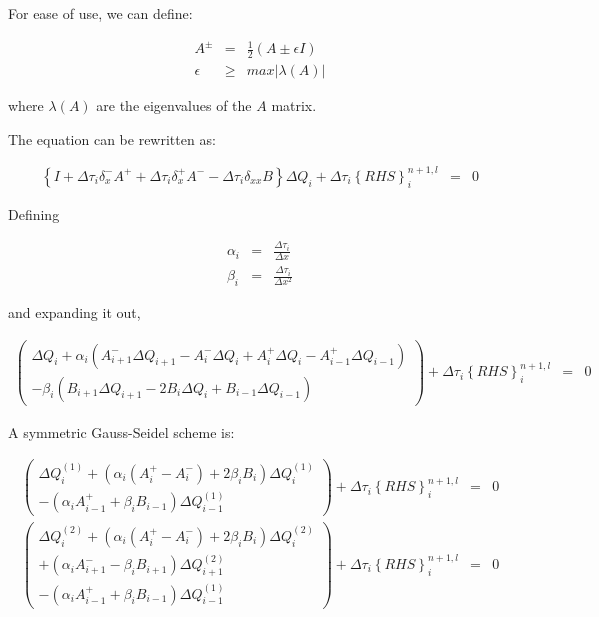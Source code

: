 For ease of use, we can define:

\begin{eqnarray}
A^{\pm} &=& \frac{1}{2} \left(A \pm \epsilon I \right)
\nonumber
\\
\epsilon &\ge& max \left|\lambda \left(A \right) \right|
\nonumber
\end{eqnarray}

where $\lambda \left(A \right)$ are the eigenvalues of the $A$ matrix.

The equation can be rewritten as:

\begin{eqnarray}
\left\{ I 
+ \Delta \tau_i \delta_x^- A^+ 
+ \Delta \tau_i \delta_x^+ A^- 
- \Delta \tau_i \delta_{xx} B 
\right\} \Delta Q_i 
+ \Delta \tau_i \left\{RHS \right\}^{n+1,l}_i &=& 0
\nonumber
\end{eqnarray}

Defining

\begin{eqnarray}
\alpha_i &=& \frac{\Delta \tau_i}{\Delta x}
\nonumber
\\
\beta_i &=& \frac{\Delta \tau_i}{\Delta x^2}
\nonumber
\end{eqnarray}

and expanding it out,

\begin{eqnarray}
\left(
\begin{array}{c}
\Delta Q_i 
+
\alpha_i
\left(
A^-_{i+1} \Delta Q_{i+1}
-A^-_{i} \Delta Q_{i}
+A^+_{i} \Delta Q_{i}
-A^+_{i-1} \Delta Q_{i-1}
\right)
\\
-
\beta_i
\left(
B_{i+1} \Delta Q_{i+1}
-2 B_{i} \Delta Q_{i}
+B_{i-1} \Delta Q_{i-1}
\right)
\end{array}
\right)
+ \Delta \tau_i \left\{RHS \right\}^{n+1,l}_i &=& 0
\nonumber
\end{eqnarray}

A symmetric Gauss-Seidel scheme is:

\begin{eqnarray}
\left(
\begin{array}{c}
\Delta Q^{\left(1 \right)}_i
+ \left(
\alpha_i \left(A^+_i - A^-_i \right)
+ 2 \beta_i B_i \right)
\Delta Q^{\left(1 \right)}_i
\\
-
\left( 
\alpha_i A^+_{i-1} 
+
\beta_i B_{i-1} 
\right)
\Delta Q^{\left(1 \right)}_{i-1}
\end{array}
\right)
+ \Delta \tau_i \left\{RHS \right\}^{n+1,l}_i &=& 0
\nonumber
\\
\left(
\begin{array}{c}
\Delta Q^{\left(2 \right)}_i
+ \left(\alpha_i \left(A^+_i - A^-_i \right)
+ 2 \beta_i B_i 
\right)
\Delta Q^{\left(2 \right)}_i
\\
+ \left( 
\alpha_i A^-_{i+1}  
-\beta_i B_{i+1} 
\right)
\Delta Q^{\left(2 \right)}_{i+1}
\\
- \left( 
 \alpha_i A^+_{i-1} 
+ \beta_i B_{i-1} 
\right)
\Delta Q^{\left(1 \right)}_{i-1}
\end{array}
\right)
+ \Delta \tau_i \left\{RHS \right\}^{n+1,l}_i &=& 0
\nonumber
\end{eqnarray}

